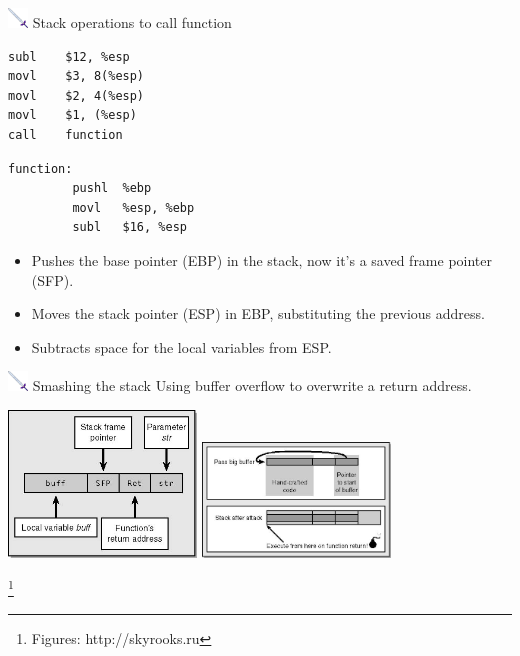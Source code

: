 \documentclass{beamer}
\newcommand{\sword}{\includegraphics[width=15pt]{sword.png} \hspace*{5pt}}
\begin{document}
\begin{frame}[fragile]{\sword Stack operations to call function}

  \begin{center}
    \begin{minipage}{4.5cm}
      \begin{lstlisting}[style=cstyle]
subl	$12, %esp
movl	$3, 8(%esp)
movl	$2, 4(%esp)
movl	$1, (%esp)
call	function
      \end{lstlisting}
    \end{minipage}
    \begin{minipage}{4.5cm}

  \begin{lstlisting}[style=cstyle]
function: 
         pushl	%ebp 
         movl	%esp, %ebp 
         subl	$16, %esp
\end{lstlisting} %
    \end{minipage}
  \end{center}
  \begin{itemize}
  \item Pushes the base pointer (EBP) in the stack, now it's a saved frame pointer (SFP).
  \item Moves the stack pointer (ESP) in EBP, substituting the previous address.
  \item Subtracts space for the local variables from ESP.
  \end{itemize}
\end{frame}

\begin{frame}{\sword Smashing the stack}
  Using buffer overflow to overwrite a return address.\\[0.4cm]
  \begin{center}
    \includegraphics[width=5cm]{stack_nosmash.jpg}
    \hspace*{0.2cm}
    \includegraphics[width=5cm]{stack_smash.jpg}
  \end{center}
  \let\thefootnote\relax\footnote{\tiny Figures: http://skyrooks.ru}
\end{frame}
\end{document}
